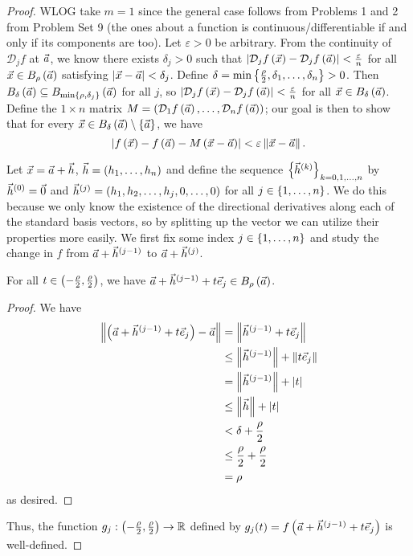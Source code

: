 \documentclass[main.tex]{subfiles}
\begin{document}
\begin{proof}
    WLOG take $m = 1$ since the general case follows from Problems 1 and 2 from Problem Set 9 (the ones about a function is continuous/differentiable if and only if its components are too). Let $\varepsilon > 0$ be arbitrary. From the continuity of $\mathcal{D}_j f$ at $\vec{a}$, we know there exists $\delta_j > 0$ such that $\left\lvert \mathcal{D}_j f\left( \vec{x} \right) - \mathcal{D}_j f\left( \vec{a} \right) \right\rvert < \frac{\varepsilon}{n}$ for all $\vec{x}\in B_\rho\left( \vec{a} \right)$ satisfying $\left\lvert \vec{x} - \vec{a} \right\rvert < \delta_j$. Define $\delta = \min\left\{ \frac{\rho}{2}, \delta_1, \ldots , \delta_n \right\} > 0$. Then $B_\delta\left( \vec{a} \right) \subseteq B_{\min\left\{ \rho, \delta_j \right\}}\left( \vec{a} \right)$ for all $j$, so $\left\lvert \mathcal{D}_j f\left( \vec{x} \right) - \mathcal{D}_j f\left( \vec{a} \right) \right\rvert < \frac{\varepsilon}{n}$ for all $\vec{x}\in B_\delta\left( \vec{a} \right)$. Define the $1\times n$ matrix $M = \left( \mathcal{D}_1 f\left( \vec{a} \right), \ldots , \mathcal{D}_n f\left( \vec{a} \right) \right)$; our goal is then to show that for every $\vec{x}\in B_\delta\left( \vec{a} \right) \setminus \left\{ \vec{a} \right\}$, we have
    \[\left\lvert f\left( \vec{x} \right) - f\left( \vec{a} \right) - M\left( \vec{x} - \vec{a} \right) \right\rvert < \varepsilon\left\lVert \vec{x} - \vec{a} \right\rVert.\]

    Let $\vec{x} = \vec{a} + \vec{h}$, $\vec{h} = (h_1, \ldots , h_n)$ and define the sequence $\left\{ \vec{h}^{(k)} \right\}_{k = 0, 1, \ldots , n}$ by $\vec{h}^{(0)} = \vec{0}$ and $\vec{h}^{(j)} = (h_1, h_2, \ldots , h_j, 0, \ldots , 0)$ for all $j \in \left\{ 1, \ldots , n \right\}$. We do this because we only know the existence of the directional derivatives along each of the standard basis vectors, so by splitting up the vector we can utilize their properties more easily. We first fix some index $j \in \left\{ 1, \ldots , n \right\}$ and study the change in $f$ from $\vec{a} + \vec{h}^{(j - 1)}$ to $\vec{a} + \vec{h}^{(j)}$.

    \begin{claim}
        For all $t\in \left( - \frac{\rho}{2}, \frac{\rho}{2} \right)$, we have $\vec{a} + \vec{h}^{(j - 1)} + t\vec{e}_j \in B_\rho\left( \vec{a} \right)$.
    \end{claim}

    \begin{proof}
        We have
        \begin{align*}
            \left\lVert \left( \vec{a} + \vec{h}^{(j - 1)} + t\vec{e}_j \right) - \vec{a} \right\rVert &= \left\lVert \vec{h}^{(j - 1)} + t\vec{e}_j \right\rVert \\
            &\le \left\lVert \vec{h}^{(j - 1)} \right\rVert + \left\lVert t\vec{e}_j \right\rVert \\
            &= \left\lVert \vec{h}^{(j - 1)} \right\rVert + \left\lvert t \right\rvert \\
            &\le \left\lVert \vec{h} \right\rVert + \left\lvert t \right\rvert \\
            &< \delta + \frac{\rho}{2} \\
            &\le \frac{\rho}{2} + \frac{\rho}{2} \\
            &= \rho
        \end{align*}
        as desired.
    \end{proof}
    Thus, the function $g_j : \left( -\frac{\rho}{2}, \frac{\rho}{2} \right) \to \mathbb R$ defined by $g_j(t) = f\left( \vec{a} + \vec{h}^{(j - 1)} + t\vec{e}_j \right)$ is well-defined.


\end{proof}
\end{document}
